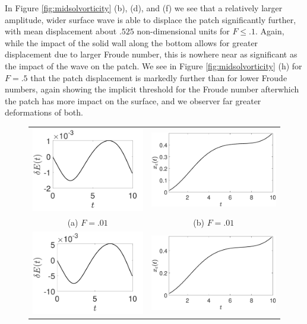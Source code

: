 \documentclass[a4paper,11pt]{article}
\begin{document}
In Figure \ref{fig:midsolvorticity} (b), (d), and (f) we see that a relatively larger amplitude, wider surface wave is able to displace the patch significantly further, with mean displacement about $.525$ non-dimensional units for $F\leq .1$.  Again, while the impact of the solid wall along the bottom allows for greater displacement due to larger Froude number, this is nowhere near as significant as the impact of the wave on the patch.  We see in Figure \ref{fig:midsolvorticity} (h) for $F=.5$ that the patch displacement is markedly further than for lower Froude numbers, again showing the implicit threshold for the Froude number afterwhich the patch has more impact on the surface, and we observer far greater deformations of both.  
\begin{figure}
\centering
\begin{tabular}{cc}
\includegraphics[width=.35\textwidth]{energy_wm_1_modu_pt6} &  \includegraphics[width=.35\textwidth]{com_wm_1_modu_pt6}\\
(a) $F=.01$ & (b) $F=.01$\\
\includegraphics[width=.35\textwidth]{energy_wm_5_modu_pt6} & \includegraphics[width=.35\textwidth]{com_wm_5_modu_pt6}\\

\end{tabular}
\end{figure}
\end{document}
